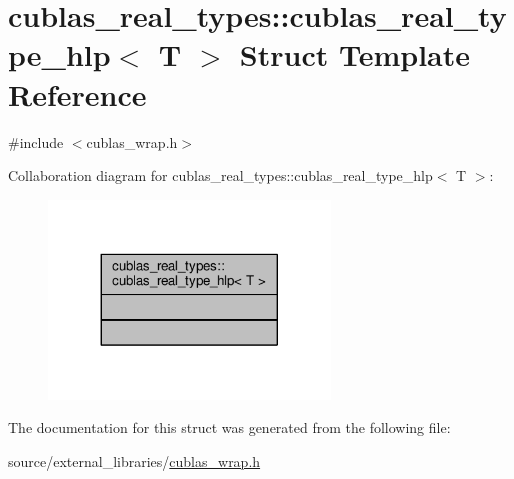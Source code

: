 \hypertarget{structcublas__real__types_1_1cublas__real__type__hlp}{\section{cublas\-\_\-real\-\_\-types\-:\-:cublas\-\_\-real\-\_\-type\-\_\-hlp$<$ T $>$ Struct Template Reference}
\label{structcublas__real__types_1_1cublas__real__type__hlp}
}


{\ttfamily \#include $<$cublas\-\_\-wrap.\-h$>$}



Collaboration diagram for cublas\-\_\-real\-\_\-types\-:\-:cublas\-\_\-real\-\_\-type\-\_\-hlp$<$ T $>$\-:\nopagebreak
\begin{figure}[H]
\begin{center}
\leavevmode
\includegraphics[width=212pt]{structcublas__real__types_1_1cublas__real__type__hlp__coll__graph}
\end{center}
\end{figure}


The documentation for this struct was generated from the following file\-:\begin{DoxyCompactItemize}
\item 
source/external\-\_\-libraries/\hyperlink{cublas__wrap_8h}{cublas\-\_\-wrap.\-h}\end{DoxyCompactItemize}
